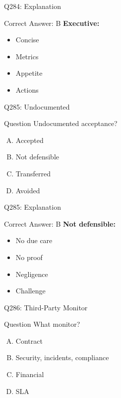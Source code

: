 \documentclass{beamer}
\begin{document}
	\begin{frame}{Q284: Explanation}
		\begin{block}{Correct Answer: B}
			\textbf{Executive:}
			\begin{itemize}
				\item Concise
				\item Metrics
				\item Appetite
				\item Actions
			\end{itemize}
		\end{block}
	\end{frame}
	
	\begin{frame}{Q285: Undocumented}
		\begin{block}{Question}
			Undocumented acceptance?
		\end{block}
		\begin{enumerate}[(A)]
			\item Accepted
			\item Not defensible
			\item Transferred
			\item Avoided
		\end{enumerate}
	\end{frame}
	
	\begin{frame}{Q285: Explanation}
		\begin{block}{Correct Answer: B}
			\textbf{Not defensible:}
			\begin{itemize}
				\item No due care
				\item No proof
				\item Negligence
				\item Challenge
			\end{itemize}
		\end{block}
	\end{frame}
	
	\begin{frame}{Q286: Third-Party Monitor}
		\begin{block}{Question}
			What monitor?
		\end{block}
		\begin{enumerate}[(A)]
			\item Contract
			\item Security, incidents, compliance
			\item Financial
			\item SLA
		\end{enumerate}
	\end{frame}
	
\end{document}
